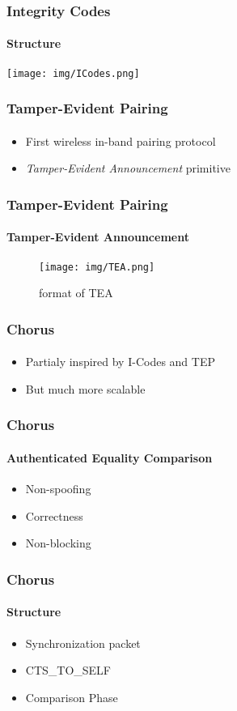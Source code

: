 \documentclass{beamer}
\begin{document}
\begin{frame}
	\frametitle{Integrity Codes}
	\framesubtitle{Structure}
	\texttt{[image: img/ICodes.png]}
\end{frame}

\begin{frame}
	\frametitle{Tamper-Evident Pairing}
	\framesubtitle{}
	\begin{itemize}
		\item First wireless in-band pairing protocol
		\item \textit{Tamper-Evident Announcement} primitive
	\end{itemize}
\end{frame}

\begin{frame}
	\frametitle{Tamper-Evident Pairing}
	\framesubtitle{Tamper-Evident Announcement}
	\begin{figure}
		\centering
		\texttt{[image: img/TEA.png]}
		\caption{format of TEA}
		\label{fig:tea}
	\end{figure}
\end{frame}

\begin{frame}
	\frametitle{Chorus}
	\framesubtitle{}
	\begin{itemize}
		\item Partialy inspired by I-Codes and TEP
		\item But much more scalable 
	\end{itemize}
\end{frame}

\begin{frame}
	\frametitle{Chorus}
	\framesubtitle{Authenticated Equality Comparison}
	\begin{itemize}
		\item Non-spoofing 
		\item Correctness
		\item Non-blocking
	\end{itemize}
\end{frame}

\begin{frame}
	\frametitle{Chorus}
	\framesubtitle{Structure}
	\begin{itemize}
		\item Synchronization packet 
		\item CTS\_TO\_SELF
		\item Comparison Phase
	\end{itemize}
\end{frame}
\end{document}
